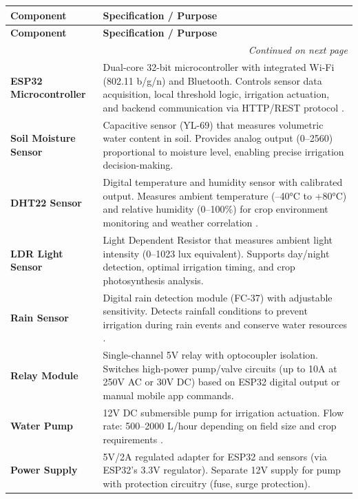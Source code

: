 \begin{tabularx}{\textwidth}{|p{}|X|}
\caption{Hardware Components and Primary Functions}
\label{tab:hardware-specs}\\

\hline
\textbf{Component} & \textbf{Specification / Purpose} \\
\hline
\endfirsthead

\hline
\textbf{Component} & \textbf{Specification / Purpose} \\
\hline
\endhead

\hline
\multicolumn{2}{r}{\small\textit{Continued on next page}}\\
\endfoot

\hline
\endlastfoot

\textbf{ESP32 Microcontroller} &
Dual-core 32-bit microcontroller with integrated Wi-Fi
(802.11 b/g/n) and Bluetooth. Controls sensor data acquisition,
local threshold logic, irrigation actuation, and backend
communication via HTTP/REST protocol \cite{raj2021survey}. \\
\hline

\textbf{Soil Moisture Sensor} &
Capacitive sensor (YL-69) that measures
volumetric water content in soil. Provides analog output (0--2560)
proportional to moisture level, enabling precise irrigation
decision-making. \\
\hline

\textbf{DHT22 Sensor} &
Digital temperature and humidity sensor with calibrated output.
Measures ambient temperature (–40°C to +80°C) and relative humidity
(0--100\%) for crop environment monitoring and weather correlation
\cite{mohanraj2016field}. \\
\hline

\textbf{LDR Light Sensor} &
Light Dependent Resistor that measures ambient light intensity
(0--1023 lux equivalent). Supports day/night detection, optimal
irrigation timing, and crop photosynthesis analysis. \\
\hline

\textbf{Rain Sensor} &
Digital rain detection module (FC-37) with adjustable
sensitivity. Detects rainfall conditions to prevent irrigation
during rain events and conserve water resources
\cite{garcia2020iot}. \\
\hline

\textbf{Relay Module} &
Single-channel 5V relay with optocoupler isolation. Switches
high-power pump/valve circuits (up to 10A at 250V AC or 30V DC)
based on ESP32 digital output or manual mobile app commands. \\
\hline

\textbf{Water Pump} &
12V DC submersible pump for irrigation
actuation. Flow rate: 500--2000 L/hour depending on field size and
crop requirements \cite{zia2021experimental}. \\
\hline

\textbf{Power Supply} &
5V/2A regulated adapter for ESP32 and sensors (via ESP32's 3.3V
regulator). Separate 12V supply for pump with protection
circuitry (fuse, surge protection). \\
\hline

\end{tabularx}

